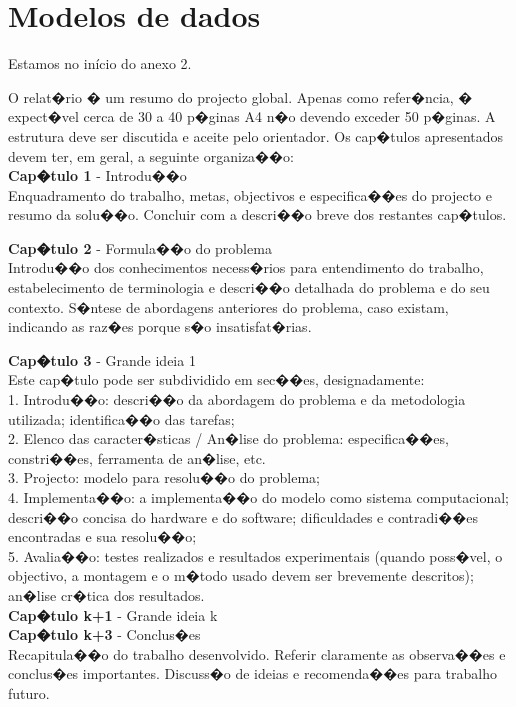 %
%
\chapter{Modelos de dados} \label{a2}

Estamos no início do anexo 2.

O relat�rio � um resumo do projecto global. Apenas como refer�ncia, � expect�vel cerca de 30 a 40 p�ginas A4 n�o devendo exceder 50 p�ginas. A estrutura deve ser discutida e aceite pelo orientador. Os cap�tulos apresentados devem ter, em geral, a seguinte organiza��o:\\

\textbf{Cap�tulo 1} - Introdu��o\\
Enquadramento do trabalho, metas, objectivos e especifica��es do projecto e resumo da solu��o. Concluir com a descri��o breve dos restantes cap�tulos.

\textbf{Cap�tulo 2} - Formula��o do problema\\
Introdu��o dos conhecimentos necess�rios para entendimento do trabalho, estabelecimento de terminologia e descri��o detalhada do problema e do seu contexto. S�ntese de abordagens anteriores do problema, caso existam, indicando as raz�es porque s�o insatisfat�rias. 

\textbf{Cap�tulo 3} - Grande ideia 1\\
Este cap�tulo pode ser subdividido em sec��es, designadamente:\\
1.	Introdu��o: descri��o da abordagem do problema e da metodologia utilizada; identifica��o das tarefas;\\
2.	Elenco das caracter�sticas / An�lise do problema: especifica��es, constri��es, ferramenta de an�lise, etc.\\
3.	Projecto: modelo para resolu��o do problema;\\
4.	Implementa��o: a implementa��o do modelo como sistema computacional; descri��o concisa do hardware e do software; dificuldades e contradi��es encontradas e sua resolu��o;\\
5.	Avalia��o: testes realizados e resultados experimentais (quando poss�vel, o objectivo, a montagem e o m�todo usado devem ser brevemente descritos); an�lise cr�tica dos resultados.\\

\textbf{Cap�tulo k+1} - Grande ideia k\\

\textbf{Cap�tulo k+3} - Conclus�es\\
Recapitula��o do trabalho desenvolvido. Referir claramente as observa��es e conclus�es importantes. Discuss�o de ideias e recomenda��es para trabalho futuro.

